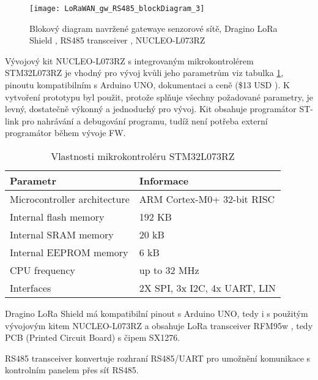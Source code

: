 \begin{figure}[!h]
    \centering
    \texttt{[image: LoRaWAN\_gw\_RS485\_blockDiagram\_3]}
    \caption{Blokový diagram navržené gatewaye senzorové sítě, Dragino LoRa Shield \cite{draginoWiki}, RS485 transceiver \cite{rs485tr}, NUCLEO-L073RZ \cite{nucleoST}}
    \label{fig:gatewayBlockDiagram}
\end{figure}

Vývojový kit NUCLEO-L073RZ s integrovaným mikrokontrolérem STM32L073RZ je vhodný pro vývoj kvůli jeho parametrům viz tabulka \ref{tab:mcuFeatures}, pinoutu kompatibilním s Arduino UNO, dokumentaci a ceně (\$13 USD \cite{nucleoST}). 
K vytvoření prototypu byl použit, protože splňuje všechny požadované parametry, je levný, dostatečně výkonný a jednoduchý pro vývoj. Kit obsahuje programátor ST-link pro nahrávání a debugování programu, tudíž není potřeba externí programátor během vývoje FW.

\begin{longtable}{|l|p{3.5cm}|}
    \caption{Vlastnosti mikrokontroléru STM32L073RZ \cite{nucleoST}}
    \label{tab:mcuFeatures} \\
    \hline

    Parametr          & Informace            \\ \hline \hline

    Microcontroller architecture & ARM Cortex-M0+ 32-bit RISC \\ \hline
    Internal flash memory & 192 KB \\ \hline
    Internal SRAM memory & 20 kB \\ \hline
    Internal EEPROM memory & 6 kB \\ \hline
    CPU frequency & up to 32 MHz \\ \hline
    Interfaces & 2X SPI, 3x I2C, 4x UART, LIN \\ \hline

\end{longtable}

Dragino LoRa Shield \cite{draginoWiki} má kompatibilní pinout s Arduino UNO, tedy i s použitým vývojovým kitem NUCLEO-L073RZ a obsahuje LoRa transceiver RFM95w \cite{RFM95w}, tedy PCB (Printed Circuit Board) s čipem SX1276. 

RS485 transceiver konvertuje rozhraní RS485/UART pro umožnění komunikace s kontrolním panelem přes síť RS485.


